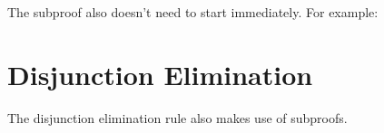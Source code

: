 The subproof also doesn't need to start immediately. For example:
\begin{fitchproof}
	\open
	\close
\end{fitchproof}
%
%
%


\section{Disjunction Elimination}\label{s:orE}
The disjunction elimination rule also makes use of subproofs.

